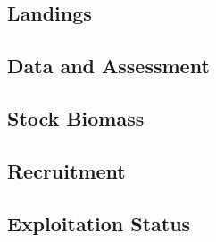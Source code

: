 \documentclass[11pt,
  english,
  a4paper,
]{article}
\begin{document}
\leavevmode\tagmcend\tagstructend


\hypertarget{landings-2}{%
\subsection*{Landings}\label{landings-2}}

\leavevmode\tagmcend\tagstructend


\hypertarget{data-and-assessment-2}{%
\subsection*{Data and Assessment}\label{data-and-assessment-2}}

\leavevmode\tagmcend\tagstructend


\hypertarget{stock-biomass-2}{%
\subsection*{Stock Biomass}\label{stock-biomass-2}}

\leavevmode\tagmcend\tagstructend


\hypertarget{recruitment-2}{%
\subsection*{Recruitment}\label{recruitment-2}}

\leavevmode\tagmcend\tagstructend


\hypertarget{exploitation-status-2}{%
\subsection*{Exploitation Status}\label{exploitation-status-2}}

\leavevmode\tagmcend\tagstructend

\end{document}
